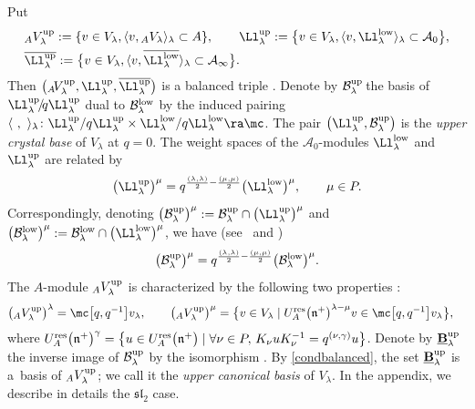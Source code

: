 Put
\begin{align}
& {}_AV_\lambda^{\rm up} := \{v\in V_\lambda, \langle v,{}_AV_\lambda\rangle_\lambda\subset A\},\qquad
\Ll_{\lambda}^{\rm up} := \big\{v\in V_\lambda, \langle v,\Ll_{\lambda}^{\rm low}\rangle_\lambda\subset \mathcal{A}_0\big\},\nonumber\\
&\overline{\Ll_{\lambda}^{\rm up}} := \big\{v\in V_\lambda, \langle v,\overline{\Ll_{\lambda}^{\rm low}}\rangle_\lambda\subset \mathcal{A}_\infty\big\}.\label{upmodule}
\end{align}
Then $\big({}_A\!V_\lambda^{\rm up},\Ll_{\lambda}^{\rm up},\overline{\Ll_{\lambda}^{\rm up}}\big)$ is a balanced triple \cite[Lemma 4.2.1]{Kashiwara2}. Denote by $\mathcal{B}_\lambda^{\rm up}\!$ the basis of~${\Ll_{\lambda}^{\rm up}\!/\!q\Ll_{\lambda}^{\rm up}}$ dual to $\mathcal{B}_\lambda^{\rm low}$ by the induced pairing $\langle\ ,\ \rangle_\lambda\colon \Ll_{\lambda}^{\rm up}/q\Ll_{\lambda}^{\rm up} \times \Ll_{\lambda}^{\rm low}/q\Ll_{\lambda}^{\rm low} \ra \mc$. The pair $\big(\Ll_{\lambda}^{\rm up},\mathcal{B}_\lambda^{\rm up}\big)$ is the {\it upper crystal base} of $V_\lambda$ at $q=0$. The weight spaces of the $\mathcal{A}_0$-modules $\Ll_{\lambda}^{\rm low}$ and $\Ll_{\lambda}^{\rm up}$ are related by
\begin{equation}\label{renormweightA} \big(\Ll_{\lambda}^{\rm up}\big)^\mu = q^{\frac{(\lambda,\lambda)}{2} - \frac{(\mu,\mu)}{2}} \big(\Ll_{\lambda}^{\rm low}\big)^\mu , \qquad \mu\in P. \end{equation}
Correspondingly, denoting $\big(\mathcal{B}_\lambda^{\rm up}\big)^\mu := \mathcal{B}_\lambda^{\rm up} \cap \big(\Ll_\lambda^{\rm up}\big)^\mu$ and $\big(\mathcal{B}_\lambda^{\rm low}\big)^\mu := \mathcal{B}_\lambda^{\rm low} \cap \big(\Ll_\lambda^{\rm low}\big)^\mu$, we have (see~\cite{Kashiwara1} and \cite[equation~(4.2.9)]{Kashiwara2})
\[\big(\mathcal{B}_\lambda^{\rm up}\big)^\mu = q^{\frac{(\lambda,\lambda)}{2} - \frac{(\mu,\mu)}{2}} \big(\mathcal{B}_\lambda^{\rm low}\big)^\mu.\]
The $A$-module ${}_AV_\lambda^{\rm up}$ is characterized by the following two properties \cite[equations~(4.2.10)--(4.2.12)]{Kashiwara2}:
\begin{align*}
\big({}_AV_\lambda^{\rm up}\big)^\lambda & = \mc\big[q,q^{-1}\big]v_\lambda,\qquad
\big({}_AV_\lambda^{\rm up}\big)^\mu = \bigl\{v\in V_\lambda \mid U_A^{\rm res}\big(\mathfrak{n}^+\big)^{\lambda-\mu} v \in \mc\big[q,q^{-1}\big]v_\lambda\bigr\},
\end{align*}
where $U_A^{\rm res}\big(\mathfrak{n}^+\big)^{\gamma} = \big\{u\in U_A^{\rm res}\big(\mathfrak{n}^+\big) \mid \forall \nu\in P, \, K_\nu uK_\nu^{-1} = q^{(\nu,\gamma)}u\big\}$. Denote by $\underline{\mathbf{B}}_\lambda^{\rm up}$ the inverse image of $\mathcal{B}_\lambda^{\rm up}$ by the isomorphism . By \eqref{condbalanced}, the set $\underline{\mathbf{B}}_\lambda^{\rm up}$ is a~basis of ${}_AV_\lambda^{\rm up}$; we call it the {\it upper canonical basis} of $V_\lambda$. In the appendix, we describe in details the ${\mathfrak{sl}_2}$ case.

